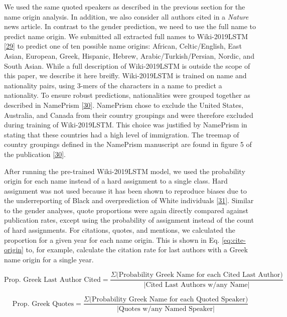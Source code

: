 We used the same quoted speakers as described in the previous section for the name origin analysis.
In addition, we also consider all authors cited in a \emph{Nature} news article.
In contrast to the gender prediction, we need to use the full name to predict name origin.
We submitted all extracted full names to Wiki-2019LSTM {[}\protect\hyperlink{ref-b1Ltmp3Z}{29}{]} to predict one of ten possible name origins: African, Celtic/English, East Asian, European, Greek, Hispanic, Hebrew, Arabic/Turkish/Persian, Nordic, and South Asian.
While a full description of Wiki-2019LSTM is outside the scope of this paper, we describe it here breifly.
Wiki-2019LSTM is trained on name and nationality pairs, using 3-mers of the characters in a name to predict a nationality.
To ensure robust predictions, nationalities were grouped together as described in NamePrism {[}\protect\hyperlink{ref-OqLU02w9}{30}{]}.
NamePrism chose to exclude the United States, Australia, and Canada from their country groupings and were therefore excluded during training of Wiki-2019LSTM.
This choice was justified by NamePrism in stating that these countries had a high level of immigration.
The treemap of country groupings defined in the NamePrism manuscript are found in figure 5 of the publication {[}\protect\hyperlink{ref-OqLU02w9}{30}{]}.

After running the pre-trained Wiki-2019LSTM model, we used the probability origin for each name instead of a hard assignment to a single class.
Hard assignment was not used because it has been shown to reproduce biases due to the underreporting of Black and overprediction of White individuals {[}\protect\hyperlink{ref-11qd8OY6e}{31}{]}.
Similar to the gender analyses, quote proportions were again directly compared against publication rates, except using the probability of assignment instead of the count of hard assignments.
For citations, quotes, and mentions, we calculated the proportion for a given year for each name origin.
This is shown in Eq. \ref{eq:cite-origin} to, for example, calculate the citation rate for last authors with a Greek name origin for a single year.

\begin{equation}\textrm{Prop. Greek Last Author Cited} = \frac{\Sigma \textrm{(Probability Greek Name for each Cited Last Author)}} {|\textrm{Cited Last Authors w/any Name}|}\label{eq:cite-origin}\end{equation}

\begin{equation}\textrm{Prop. Greek Quotes} = \frac{\Sigma \textrm{(Probability Greek Name for each Quoted Speaker)}} {| \textrm{Quotes w/any Named Speaker}|}\label{eq:quote-origin}\end{equation}

